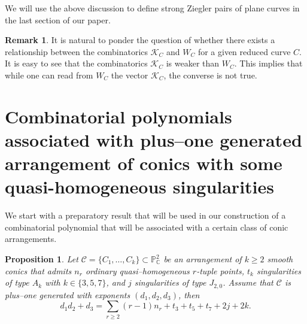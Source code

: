 \documentclass[11pt]{article}
\theoremstyle{plain}
\newtheorem{proposition}[thm]{Proposition}
\theoremstyle{definition}
\newtheorem{remark}[thm]{Remark}
\begin{document}
We will use the above discussion to define strong Ziegler pairs of plane curves in the last section of our paper.

\begin{remark}
It is natural to ponder the question of whether there exists a relationship between the combinatorics $\mathcal{K}_C$ and $W_C$ for a given reduced curve $C$. It is easy to see that the combinatorics $\mathcal{K}_C$ is weaker than $W_C$. This implies that while one can read from $W_C$ the vector $\mathcal{K}_C$, the converse is not true.
\end{remark}

\section{Combinatorial polynomials associated with plus--one generated arrangement of conics with some quasi-homogeneous singularities}
We start with a preparatory result that will be used in our construction of a combinatorial polynomial that will be associated with a certain class of conic arrangements.
\begin{proposition}
\label{31}
    Let $\mathcal{C}=\{C_1,\ldots, C_k\}\subset\mathbb{P}^2_{\mathbb{C}}$ be an arrangement of $k\geq2$ smooth conics that admits $n_r$ ordinary quasi--homogeneous $r$-tuple points, $t_k$ singularities of type $A_k$ with $k \in \{3,5,7\}$, and $j$ singularities of type $J_{2,0}$. Assume that $\mathcal{C}$ is plus--one generated with exponents $(d_1, d_2, d_3)$, then
    $$d_1d_2+d_3=\sum_{r\geq2}{(r-1)n_r}+t_3+t_5+t_7+2j+2k.$$
\end{proposition}
\end{document}
